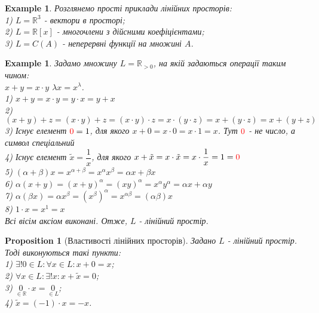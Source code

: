 \documentclass[a4paper, 10pt]{article}
\theoremstyle{theoremdd}
\newtheorem{example}[theorem]{Example}
\newtheorem{proposition}[theorem]{Proposition}
\begin{document}
	\begin{example}
	Розглянемо прості приклади лінійних просторів: \\
	1) $L = \mathbb{R}^3$ - вектори в просторі; \\
	2) $L = \mathbb{R}[x]$ - многочлени з дійсними коефіцієнтами; \\
	3) $L = C(A)$ - неперервні функції на множині $A$.
	\end{example}
	
	\begin{example}
	Задамо множину $L = \mathbb{R}_{> 0}$, на якій задаються операції таким чином:\\
	$x + y = x \cdot y$ \hspace{1cm} $\lambda x = x^\lambda$.\\
	1) $x+y = x \cdot y = y \cdot x = y + x$ \\
	2) $(x+y) + z = (x \cdot y) + z = (x \cdot y) \cdot z = x \cdot (y \cdot z) = x + (y \cdot z) = x + (y + z)$ \\
	3) Існує елемент $\textcolor{red}{0} = 1$, для якого $x + 0 = x \cdot 0 = x \cdot 1 = x$. Тут $\textcolor{red}{0}$ - не число, а символ спеціальний\\
	4) Існує елемент $\tilde{x} = \dfrac{1}{x}$, для якого $x + \tilde{x} = x \cdot \tilde{x} = x \cdot \dfrac{1}{x} = 1 = \textcolor{red}{0}$\\
	5) $(\alpha + \beta)x = x^{\alpha + \beta} = x^{\alpha} x^{\beta} = \alpha x + \beta x$ \\
	6) $\alpha (x+y) = (x+y)^\alpha = (xy)^{\alpha} = x^{\alpha} y^{\alpha} = \alpha x + \alpha y$ \\
	7) $\alpha (\beta x) = \alpha x^\beta = (x^\beta)^\alpha = x^{\alpha \beta} = (\alpha \beta) x$ \\
	8) $1 \cdot x = x^1 = x$\\
	Всі вісім аксіом виконані. Отже, $L$ - лінійний простір.
	\end{example}
	
	\begin{proposition}[Властивості лінійних просторів]
	Задано $L$ - лінійний простір. Тоді виконуються такі пункти:\\
	1) $\exists !0 \in L: \forall x \in L: x + 0 = x$;\\
	2) $\forall x \in L: \exists! x: x + \tilde{x} = 0$;\\
	3) $\underset{\in \mathbb{R}}{0} \cdot x = \underset{\in L}{0}$;\\
	4) $\tilde{x} = (-1) \cdot x = -x$.
	\end{proposition}
	
\end{document}
